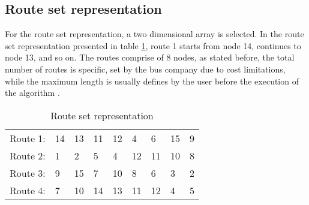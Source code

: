\subsection{Route set representation}
For the route set representation, a two dimensional array is selected. In the route set representation presented in table \ref{table:routeSetRepr}, route 1 starts from node 14, continues to node 13, and so on. The routes comprise of 8 nodes, as stated before, the total number of routes is specific, set by the bus company due to cost limitations, while the maximum length is usually defines by the user before the execution of the algorithm \citep{kechagiopoulos14}.
\begin{table}[H]
    \begin{center}
        \begin{tabular}{|l| l l l l l l l l|}
      \hline
        Route 1: & 14 & 13 & 11 & 12 & 4 & 6 & 15 & 9 \\
        Route 2: & 1 & 2 & 5 & 4 & 12 & 11 & 10 & 8 \\
        Route 3: & 9 & 15 & 7 & 10 & 8 & 6 & 3 & 2 \\
        Route 4: & 7 & 10 & 14 & 13 & 11 & 12 & 4 & 5 \\
      \hline
        \end{tabular}
    \end{center}
    \caption {Route set representation}
    \label{table:routeSetRepr}
\end{table}





